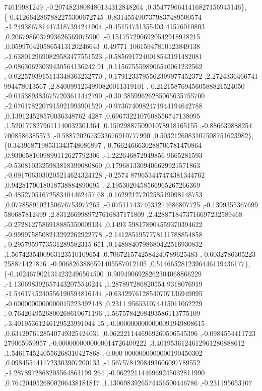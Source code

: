 \begin{DoxyCode}
      74619981249 ,-0.2074823808480134312848264 ,0.3547796641416827156945146\},
\{-0.4126642867882275300672745 ,0.8314554907379837489500574 ,-1.2493867814473187394241904 ,-0.45154731355403
      41576010803 ,0.2067986037993626569075900 ,-0.1517572906920542918918215 ,0.0599704205865413120246643 ,0.49771
      10615947810123849138 ,-1.6380129690829583477551523 ,-0.5856917240018543191482081 ,-0.08630623039430564136242
      91 ,0.1156755598906540061232562 ,-0.0225793915113348363232770 ,-0.1791233795562399977452372 ,2.2724336466741
      994478013567 ,2.8400991234990820011319101 ,-0.2121587694560588821524050 ,-0.0153893836757203611442790 ,-0.30
      38599626285065635755700 ,-2.0761782207915921993901520 ,-0.9736740982471944194642788 ,0.139124528570036348762
      4287 ,0.6967322107608556747138095 ,1.5201778279611140032301364 ,0.1502988750901078918165155 ,-0.886639888254
      7008586385573 ,-0.5887202673933676910777990 ,0.5032126083107508751623982\},
\{0.3439687198531343748086897 ,-0.7662466630288706781470864 ,0.9300581009899112627792306 ,-1.222646872949856
      9665281593 ,-0.5308103325983818399080860 ,0.1796813309406629921571863 ,-0.0917063030205214624324128 ,-0.2574
      879653447474381344762 ,0.9428170018018738884890695 ,-2.1953020458566965267266369 ,-0.48527051672583404462457
      68 ,0.1629212720258519098148753 ,0.0778589102150676753977265 ,-0.0751174374033214686807725 ,-0.1399355367699
      580687812499 ,2.8312669989727616837171809 ,2.4288718473716697232589468 ,-0.2728127586918885350009134 ,0.1493
      598178904559370394622 ,-0.9999758508213292262922778 ,-2.1412851957778111788854858 ,-0.2957959773531289582315
      651 ,0.1488840798680422516930832 ,1.5674235400963123510109654 ,0.7067215742584240789625483 ,-0.6032786305223
      258871421876 ,-0.9068263886591405587012105 ,0.5146652812396446119436177\},
\{-0.4024679021314232496564500 ,0.9094906928262304068866229 ,-1.1306983926574432075540244 ,1.287897286820554
      9318076919 ,-1.5461745240556190594816144 ,-0.6342976128540707136949095 ,-0.0000000000000015223492148 ,0.2311
      956531074415011062229 ,-0.7642049526800268610671196 ,1.5675784208493586113775109 ,-3.40195361246129523991044
      15 ,-0.0000000000000091949808615 ,0.6342976128540749325424031 ,0.0622211446969260506545396 ,-0.0984554411723
      279065959957 ,-0.0000000000000014726409222 ,3.4019536124612961280888612 ,1.5461745240556268310427868 ,-0.000
      0000000000000190450302 ,0.0984554411723303907200133 ,-1.5675784208493606097789552 ,-1.2878972868205564861199
      264 ,-0.0622211446969245032811990 ,0.7642049526800206438181817 ,1.1306983926574456500446786 ,-0.231195653107

\end{DoxyCode}
